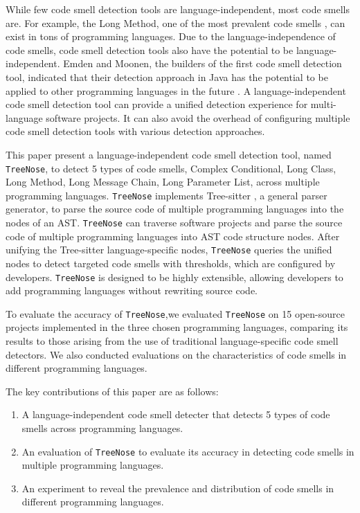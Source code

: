 While few code smell detection tools are language-independent, most code smells are. For example, the Long Method, one of the most prevalent code smells \cite{developersCare}, can exist in tons of programming languages.
Due to the language-independence of code smells, code smell detection tools also have the potential to be language-independent.
Emden and Moonen, the builders of the first code smell detection tool, indicated that their detection
approach in Java has the potential to be applied to other programming languages in the future \cite{1173068}. A language-independent code smell detection tool can
provide a unified detection experience for multi-language software projects. It can also avoid the overhead 
of configuring multiple code smell detection tools with various detection approaches.

This paper present a language-independent code smell detection tool, named \texttt{TreeNose}, to detect 5 types of code smells, Complex Conditional, 
Long Class, Long Method, Long Message Chain, Long Parameter List, across multiple programming languages.
\texttt{TreeNose} implements Tree-sitter \cite{treeSitter}, a general parser generator,
to parse the source code of multiple programming languages into the nodes of an AST. \texttt{TreeNose} can traverse software projects and parse the source code of multiple programming languages 
into AST code structure nodes. After unifying the Tree-sitter language-specific nodes,
\texttt{TreeNose} queries the unified nodes to detect targeted code smells with thresholds, which are configured by developers.
\texttt{TreeNose} is designed to be highly extensible, allowing developers to add programming languages without rewriting source code.
  
To evaluate the accuracy of \texttt{TreeNose},we evaluated \texttt{TreeNose} on 15 open-source projects
implemented in the three chosen programming languages, comparing
its results to those arising from the use of traditional language-specific
code smell detectors. We also conducted evaluations on the characteristics 
of code smells in different programming languages. 

The key contributions of this paper are as follows:

\begin{enumerate}
    \item A language-independent code smell detecter that detects 5 types of code smells across programming languages.
    \item An evaluation of \texttt{TreeNose} to evaluate its accuracy in detecting code smells in multiple programming languages.
    \item An experiment to reveal the prevalence and distribution of code smells in different programming languages.
\end{enumerate}